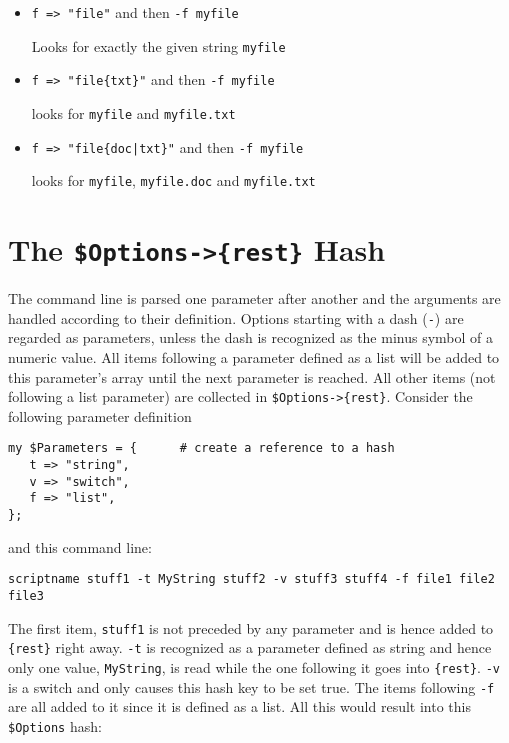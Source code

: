 \documentclass[12pt, a4paper]{article}
\begin{document}
\begin{itemize}
\item \verb'f => "file"' and then \verb'-f myfile'

Looks for exactly the given string \verb'myfile'

\item \verb'f => "file{txt}"' and then \verb'-f myfile'

looks for \verb'myfile' and \verb'myfile.txt'

\item \verb'f => "file{doc|txt}"' and then \verb'-f myfile'

looks for \verb'myfile', \verb'myfile.doc' and \verb'myfile.txt'
\end{itemize}



\section{The \texttt{\$Options->\{rest\}} Hash}

\label{Sec:rest}

The command line is parsed one parameter after another and the arguments are handled according to their definition. Options starting with a dash (\texttt{-}) are regarded as parameters, unless the dash is recognized as the minus symbol of a numeric value. All items following a parameter defined as a list will be added to this parameter's array until the next parameter is reached. All other items (not following a list parameter) are collected in \verb'$Options->{rest}'. Consider the following parameter definition

\begin{verbatim}
my $Parameters = {      # create a reference to a hash
   t => "string",
   v => "switch",
   f => "list",
};
\end{verbatim}

and this command line:

\begin{verbatim}
scriptname stuff1 -t MyString stuff2 -v stuff3 stuff4 -f file1 file2 file3
\end{verbatim}

The first item, \verb'stuff1' is not preceded by any parameter and is hence added to \verb'{rest}' right away. \verb'-t' is recognized as a parameter defined as string and hence only one value, \verb'MyString', is read while the one following it goes into \verb'{rest}'. \verb'-v' is a switch and only causes this hash key to be set true. The items following \verb'-f' are all added to it since it is defined as a list. All this would result into this \verb'$Options' hash:
\end{document}
